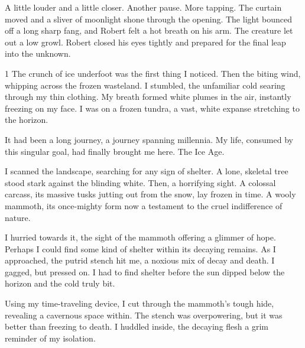 \documentclass{article}
\newcommand{\baselinezs}{{\sc E2E$_{ZS}$}}
\begin{document}
\begin{tcolorbox}[colback=white, colframe=my-green, coltitle=black, parskip=5mm, title=
    \textbf{Human-written Story}, breakable]
        A little louder and a little closer. Another pause. More tapping. The curtain moved and a sliver of moonlight shone through the opening. The light bounced off a long sharp fang, and Robert felt a hot breath on his arm. The creature let out a low growl. 
        Robert closed his eyes tightly and prepared for the final leap into the unknown.
\end{tcolorbox}
\newpage

 \begin{tcolorbox}[colback=white, colframe=gray!30!white, coltitle=black, parskip=5mm, title=
    \textbf{System output: \baselinezs}, breakable]
    \scriptsize
    \begin{spacing}{1}
The crunch of ice underfoot was the first thing I noticed. Then the biting wind, whipping across the frozen wasteland. I stumbled, the unfamiliar cold searing through my thin clothing. My breath formed white plumes in the air, instantly freezing on my face.  I was on a frozen tundra, a vast, white expanse stretching to the horizon.\\\par

It had been a long journey, a journey spanning millennia. My life, consumed by this singular goal, had finally brought me here. The Ice Age.\\\par

I scanned the landscape, searching for any sign of shelter. A lone, skeletal tree stood stark against the blinding white.  Then, a horrifying sight. A colossal carcass, its massive tusks jutting out from the snow, lay frozen in time. A wooly mammoth, its once-mighty form now a testament to the cruel indifference of nature.\\\par

I hurried towards it, the sight of the mammoth offering a glimmer of hope. Perhaps I could find some kind of shelter within its decaying remains. As I approached, the putrid stench hit me, a noxious mix of decay and death. I gagged, but pressed on. I had to find shelter before the sun dipped below the horizon and the cold truly bit.\\\par

Using my time-traveling device, I cut through the mammoth's tough hide, revealing a cavernous space within. The stench was overpowering, but it was better than freezing to death. I huddled inside, the decaying flesh a grim reminder of my isolation.\\\par


\end{spacing}
\end{tcolorbox}
\end{document}
